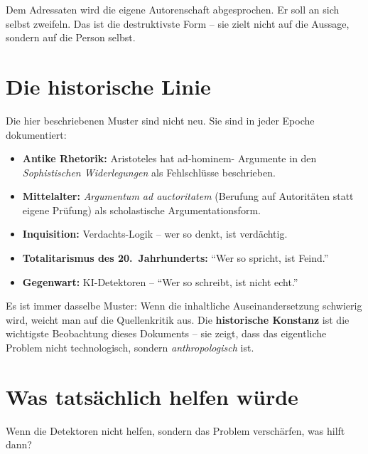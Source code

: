 Dem Adressaten wird die eigene Autorenschaft abgesprochen. Er soll
an sich selbst zweifeln. Das ist die destruktivste Form -- sie
zielt nicht auf die Aussage, sondern auf die Person selbst.

\section{Die historische Linie}

Die hier beschriebenen Muster sind nicht neu. Sie sind in jeder
Epoche dokumentiert:

\begin{itemize}[leftmargin=2em,itemsep=2pt,topsep=2pt]
  \item \textbf{Antike Rhetorik:} Aristoteles hat ad-hominem-
        Argumente in den \emph{Sophistischen Widerlegungen} als
        Fehlschlüsse beschrieben.
  \item \textbf{Mittelalter:} \emph{Argumentum ad auctoritatem}
        (Berufung auf Autoritäten statt eigene Prüfung) als
        scholastische Argumentationsform.
  \item \textbf{Inquisition:} Verdachts-Logik -- wer so denkt, ist
        verdächtig.
  \item \textbf{Totalitarismus des 20.~Jahrhunderts:} \enquote{Wer
        so spricht, ist Feind.}
  \item \textbf{Gegenwart:} KI-Detektoren -- \enquote{Wer so
        schreibt, ist nicht echt.}
\end{itemize}

Es ist immer dasselbe Muster: Wenn die inhaltliche Auseinandersetzung
schwierig wird, weicht man auf die Quellenkritik aus. Die
\textbf{historische Konstanz} ist die wichtigste Beobachtung dieses
Dokuments -- sie zeigt, dass das eigentliche Problem nicht
technologisch, sondern \emph{anthropologisch} ist.

\section{Was tatsächlich helfen würde}

Wenn die Detektoren nicht helfen, sondern das Problem verschärfen,
was hilft dann?

